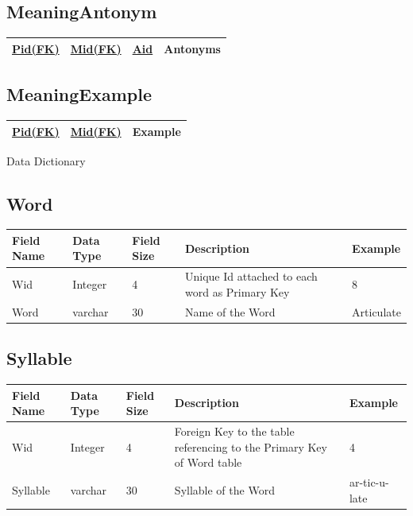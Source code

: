 \documentclass{article}
\begin{document}
\subsection*{Meaning\textunderscore Antonym}
{\selectfont
\begin{center}
\begin{tabular}{ |c|c|c|c| } 
 \hline
\large\underline{{Pid(FK)}} & \large\underline{{Mid(FK)}} & \large\underline{{Aid}} &\large{Antonyms}\\  
 \hline
\end{tabular}
\end{center}
}

\subsection*{Meaning\textunderscore Example}
{\selectfont
\begin{center}
\begin{tabular}{ |c|c|c|} 
 \hline
\large\underline{{Pid(FK)}} & \large\underline{{Mid(FK)}} & \large{Example}\\  
 \hline
\end{tabular}
\end{center}
}
\pagebreak

\huge{Data Dictionary}\\ 
\hline

\subsection*{Word}
\begin{center}
\begin{tabular}{ |m{2em}|m{2em}|m{2em}|m{4cm}|m{2cm}| } 
 \hline
\large\textbf{Field Name} & \large\textbf{Data Type} & \large\textbf{Field Size} & \large\textbf{Description} & \large\textbf{Example}\\  
 \hline
\small Wid & \small Integer &\small 4 &\small Unique Id attached to each word as Primary Key &\small 8 \\
\hline
\small Word & \small varchar &\small 30 &\small Name of the Word &\small Articulate \\
\hline
\end{tabular}
\end{center}

\subsection*{Syllable}
\begin{center}
\begin{tabular}{ |m{2em}|m{2em}|m{2em}|m{4cm}|m{2cm}| } 
 \hline
\large\textbf{Field Name} & \large\textbf{Data Type} & \large\textbf{Field Size} & \large\textbf{Description} & \large\textbf{Example}\\  
 \hline
\small Wid & \small Integer &\small 4 &\small Foreign Key to the table referencing to the Primary Key of Word table &\small 4 \\
\hline
\small Syllable & \small varchar &\small 30 &\small Syllable of the Word &\small ar-tic-u-late \\
\hline
\end{tabular}
\end{center}
\end{document}
